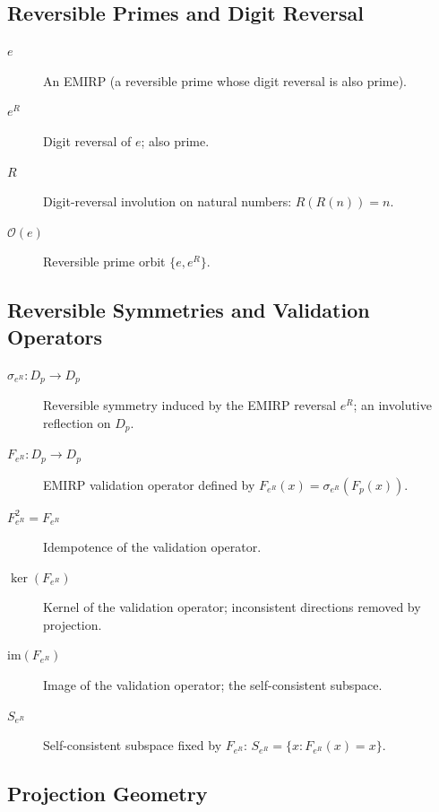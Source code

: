 \documentclass[11pt]{article}
\theoremstyle{definition}
\theoremstyle{plain}
\theoremstyle{remark}
\begin{document}
\subsection*{Reversible Primes and Digit Reversal}

\begin{description}

\item[$e$] An EMIRP (a reversible prime whose digit reversal is also
prime).

\item[$e^R$] Digit reversal of $e$; also prime.

\item[$R$] Digit-reversal involution on natural numbers:
$R(R(n)) = n$.

\item[$\mathcal{O}(e)$] Reversible prime orbit $\{e, e^R\}$.

\end{description}

\subsection*{Reversible Symmetries and Validation Operators}

\begin{description}

\item[$\sigma_{e^R} : D_p \to D_p$] Reversible symmetry induced by the
EMIRP reversal $e^R$; an involutive reflection on $D_p$.

\item[$F_{e^R} : D_p \to D_p$] EMIRP validation operator defined by
$F_{e^R}(x) = \sigma_{e^R}(F_p(x))$.

\item[$F_{e^R}^2 = F_{e^R}$] Idempotence of the validation operator.

\item[$\ker(F_{e^R})$] Kernel of the validation operator; inconsistent
directions removed by projection.

\item[$\mathrm{im}(F_{e^R})$] Image of the validation operator; the
self-consistent subspace.

\item[$S_{e^R}$] Self-consistent subspace fixed by $F_{e^R}$:
$S_{e^R} = \{x : F_{e^R}(x) = x\}$.

\end{description}

\subsection*{Projection Geometry}
\end{document}
